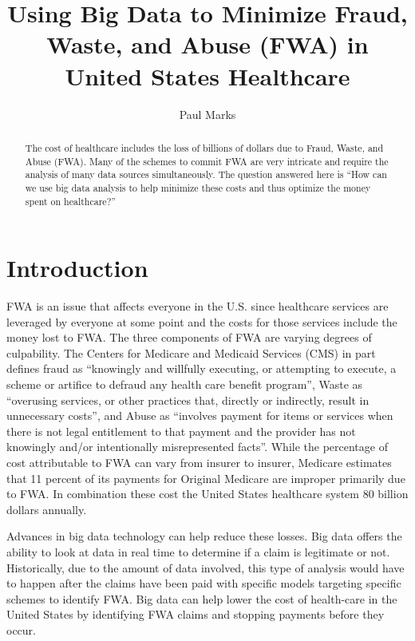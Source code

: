 \documentclass[sigconf]{acmart}
\begin{document}
\title{Using Big Data to Minimize Fraud, Waste, and Abuse (FWA) in United States Healthcare}


\author{Paul Marks}


\begin{abstract}
The cost of healthcare includes the loss of billions of dollars due to Fraud, 
Waste, and Abuse (FWA).  Many of the schemes to commit FWA are very intricate and 
require the analysis of many data sources simultaneously.  The question answered 
here is ``How can we use big data analysis to help minimize these costs and thus 
optimize the money spent on healthcare?''
\end{abstract}



\maketitle

\section{Introduction}

FWA is an issue that affects everyone in the U.S. since healthcare services are 
leveraged by everyone at some point and the costs for those services include the 
money lost to FWA.  The three components of FWA are varying degrees of 
culpability.  The Centers for Medicare and Medicaid Services (CMS) in part defines 
fraud as ``knowingly and willfully executing, or attempting to execute, a scheme or 
artifice to defraud any health care benefit program'', Waste as ``overusing services, 
or other practices that, directly or indirectly, result in unnecessary costs'', and 
Abuse as ``involves payment for items or services when there is not legal entitlement 
to that payment and the provider has not knowingly and/or intentionally 
misrepresented facts''.\cite{MLNFWA}  While the percentage of cost attributable to 
FWA can vary from insurer to insurer, Medicare estimates that 11 percent of its 
payments for Original Medicare are improper primarily due to FWA.\cite{FY2016HHSFR}  
In combination these cost the United States healthcare system 80 billion 
dollars\cite{HFMA} annually.  

Advances in big data technology can help reduce these losses.  Big data offers the 
ability to look at data in real time to determine if a claim is legitimate or not.  
Historically, due to the amount of data involved, this type of analysis would have to 
happen after the claims have been paid with specific models targeting specific 
schemes to identify FWA.  Big data can help lower the cost of health-care in the 
United States by identifying FWA claims and stopping payments before they occur. 
\end{document}
